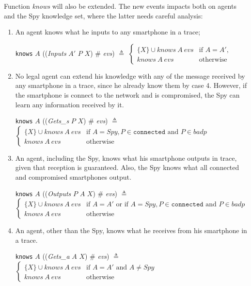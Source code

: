 Function \textit{knows} will also be extended. The new events impacts both on agents and the Spy knowledge set, where the latter needs careful analysis:
\begin{enumerate}
  \item An agent knows what he inputs to any smartphone in a trace;
  \begin{center}
    \texttt{knows} $A$ ((\textit{Inputs} $A'$ $P$ $X$) $\#$ \textit{evs}) $\triangleq$ $\begin{cases}
      \{ X\} \cup \textit{knows}\ A\ evs & \text{if } A = A', \\
      \textit{knows}\ A\ evs & \text{otherwise}
    \end{cases}$
  \end{center}

  \item No legal agent can extend his knowledge with any of the message received by any smartphone in a trace, since he already know them by case 4. However, if the smartphone is connect to the network and is compromised, the Spy can learn any information received by it.
  \begin{center}
    \texttt{knows} $A$ ((\textit{Gets\_s} $P$ $X$) $\#$ \textit{evs}) $\triangleq$ $\begin{cases}
      \{ X\} \cup \textit{knows}\ A\ evs & \text{if } A = Spy, P \in \texttt{connected} \text{ and } P \in badp\\
      \textit{knows}\ A\ evs & \text{otherwise}
    \end{cases}$
  \end{center}

  \item An agent, including the Spy, knows what his smartphone outputs in trace, given that reception is guaranteed. Also, the Spy knows what all connected and compromised smartphones output.
  \begin{center}
    \texttt{knows} $A$ ((\textit{Outputs} $P$ $A$ $X$) $\#$ \textit{evs}) $\triangleq$ $\begin{cases}
      \{ X\} \cup \textit{knows}\ A\ evs & \text{if } A = A' \text{ or if } A = Spy, P \in \texttt{connected} \text{ and } P \in badp \\
      \textit{knows}\ A\ evs & \text{otherwise}
    \end{cases}$
  \end{center}

  \item An agent, other than the Spy, knows what he receives from his smartphone in a trace.
  \begin{center}
    \texttt{knows} $A$ ((\textit{Gets\_a} $A$ $X$) $\#$ \textit{evs}) $\triangleq$ $\begin{cases}
      \{ X\} \cup \textit{knows}\ A\ evs & \text{if } A = A' \text{ and } A \neq Spy \\
      \textit{knows}\ A\ evs & \text{otherwise}
    \end{cases}$
  \end{center}
\end{enumerate}

%
